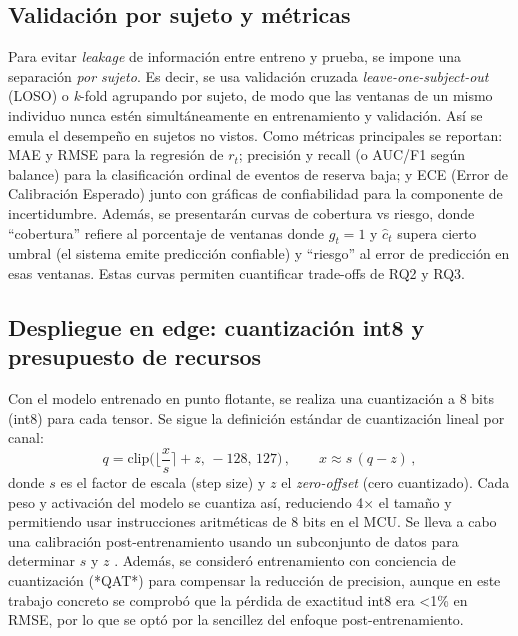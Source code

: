 \documentclass[10pt,a4paper,twocolumn]{article}
\begin{document}
\subsection{Validaci\'on por sujeto y m\'etricas}

Para evitar \emph{leakage} de informaci\'on entre entreno y prueba, se impone una separaci\'on \emph{por sujeto}. Es decir, se usa validaci\'on cruzada \emph{leave-one-subject-out} (LOSO) o \emph{k}-fold agrupando por sujeto, de modo que las ventanas de un mismo individuo nunca est\'en simult\'aneamente en entrenamiento y validaci\'on. As\'i se emula el desempe\~no en sujetos no vistos. Como m\'etricas principales se reportan: MAE y RMSE para la regresi\'on de $r_t$; precisi\'on y recall (o AUC/F1 seg\'un balance) para la clasificaci\'on ordinal de eventos de reserva baja; y ECE (Error de Calibraci\'on Esperado) junto con gr\'aficas de confiabilidad para la componente de incertidumbre. Adem\'as, se presentar\'an curvas de cobertura vs riesgo, donde ``cobertura'' refiere al porcentaje de ventanas donde $g_t=1$ y $\hat c_t$ supera cierto umbral (el sistema emite predicci\'on confiable) y ``riesgo'' al error de predicci\'on en esas ventanas. Estas curvas permiten cuantificar trade-offs de RQ2 y RQ3.

\subsection{Despliegue en edge: cuantizaci\'on int8 y presupuesto de recursos}

Con el modelo entrenado en punto flotante, se realiza una cuantizaci\'on a 8 bits (int8) para cada tensor. Se sigue la definici\'on est\'andar de cuantizaci\'on lineal por canal:
\begin{equation}
q = \mathrm{clip}\Big(\Big\lfloor \frac{x}{s}\Big\rceil + z,\,-128,\,127\Big)\,, \qquad x \approx s\,(q - z)\,,
\label{eq:quant}
\end{equation}
donde $s$ es el factor de escala (step size) y $z$ el \emph{zero-offset} (cero cuantizado). Cada peso y activaci\'on del modelo se cuantiza as\'i, reduciendo 4$\times$ el tama\~no y permitiendo usar instrucciones aritm\'eticas de 8 bits en el MCU. Se lleva a cabo una calibraci\'on post-entrenamiento usando un subconjunto de datos para determinar $s$ y $z$ \cite{wang2021quantization}. Adem\'as, se consider\'o entrenamiento con conciencia de cuantizaci\'on (*QAT*) para compensar la reducci\'on de precision, aunque en este trabajo concreto se comprob\'o que la p\'erdida de exactitud int8 era <1\% en RMSE, por lo que se opt\'o por la sencillez del enfoque post-entrenamiento.
\end{document}
